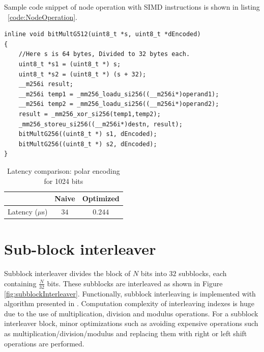Sample code snippet of node operation with SIMD instructions is shown in listing ~\ref{code:NodeOperation}.

\begin{code}
	\label{code:NodeOperation}
\begin{verbatim}
inline void bitMultG512(uint8_t *s, uint8_t *dEncoded) 
{
	//Here s is 64 bytes, Divided to 32 bytes each.
	uint8_t *s1 = (uint8_t *) s;
	uint8_t *s2 = (uint8_t *) (s + 32);
	__m256i result;
	__m256i temp1 = _mm256_loadu_si256((__m256i*)operand1);
	__m256i temp2 = _mm256_loadu_si256((__m256i*)operand2);
	result = _mm256_xor_si256(temp1,temp2);
	_mm256_storeu_si256((__m256i*)destn, result);
	bitMultG256((uint8_t *) s1, dEncoded);
	bitMultG256((uint8_t *) s2, dEncoded);
}
\end{verbatim}
\end{code}

\begin{table}[!h]
	\begin{center}
		\caption{Latency comparison: polar encoding for 1024 bits}
		\label{tab:polarEncoder}
		\begin{tabular}{c|c|c} %
			\textbf{ } & Naive & Optimized \\
			\hline
			Latency ($\mu$s) & $34$ & $0.244$\\
		\end{tabular}
	\end{center}
\end{table}


\section{Sub-block interleaver}
Subblock interleaver divides the block of $N$ bits into $32$ subblocks, each containing $\frac{N}{32}$ bits. These subblocks are interleaved as shown in Figure \ref{fig:subblockInterleaver}. Functionally, subblock interleaving is implemented with algorithm presented in \cite{3gpp.38.212}. Computation complexity of interleaving indexes is huge due to the use of multiplication, division and modulus operations. For a subblock interleaver block, minor optimizations such as avoiding expensive operations such as multiplication/division/modulus and replacing them with right or left shift operations are performed.

